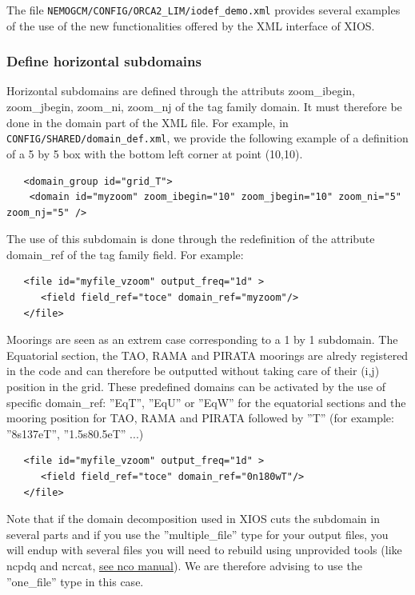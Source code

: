 The file {\tt NEMOGCM/CONFIG/ORCA2\_LIM/iodef\_demo.xml} provides several examples of the use of the new functionalities offered by the XML interface of XIOS. 

\subsubsection{Define horizontal subdomains}
Horizontal subdomains are defined through the attributs zoom\_ibegin, zoom\_jbegin, zoom\_ni, zoom\_nj of the tag family domain. It must therefore be done in the domain part of the XML file. For example, in {\tt CONFIG/SHARED/domain\_def.xml}, we provide the following example of a definition of a 5 by 5 box with the bottom left corner at point (10,10).
\vspace{-20pt}
\begin{alltt}  {{\scriptsize
\begin{verbatim}
   <domain_group id="grid_T">
    <domain id="myzoom" zoom_ibegin="10" zoom_jbegin="10" zoom_ni="5" zoom_nj="5" />
\end{verbatim}
}}\end{alltt} 
The use of this subdomain is done through the redefinition of the attribute domain\_ref of the tag family field. For example:
\vspace{-20pt}
\begin{alltt}  {{\scriptsize
\begin{verbatim}
   <file id="myfile_vzoom" output_freq="1d" >
      <field field_ref="toce" domain_ref="myzoom"/>
   </file>
\end{verbatim}
}}\end{alltt} 
Moorings are seen as an extrem case corresponding to a 1 by 1 subdomain. The Equatorial section, the TAO, RAMA and PIRATA moorings are alredy registered in the code and can therefore be outputted without taking care of their (i,j) position in the grid. These predefined domains can be activated by the use of specific domain\_ref: ''EqT'', ''EqU'' or ''EqW'' for the equatorial sections and the mooring position for TAO, RAMA and PIRATA followed by ''T'' (for example: ''8s137eT'', ''1.5s80.5eT'' ...)
\vspace{-20pt}
\begin{alltt}  {{\scriptsize
\begin{verbatim}
   <file id="myfile_vzoom" output_freq="1d" >
      <field field_ref="toce" domain_ref="0n180wT"/>
   </file>
\end{verbatim}
}}\end{alltt} 
Note that if the domain decomposition used in XIOS cuts the subdomain in several parts and if you use the ''multiple\_file'' type for your output files, you will endup with several files you will need to rebuild using unprovided tools (like ncpdq and ncrcat, \href{http://nco.sourceforge.net/nco.html#Concatenation}{see nco manual}). We are therefore advising to use the ''one\_file'' type in this case.

